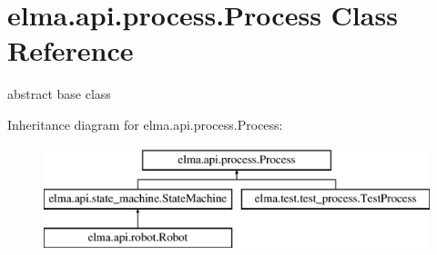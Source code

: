 \hypertarget{classelma_1_1api_1_1process_1_1Process}{}\section{elma.\+api.\+process.\+Process Class Reference}
\label{classelma_1_1api_1_1process_1_1Process}


abstract base class  


Inheritance diagram for elma.\+api.\+process.\+Process\+:\begin{figure}[H]
\begin{center}
\leavevmode
\includegraphics[height=3.000000cm]{classelma_1_1api_1_1process_1_1Process}
\end{center}
\end{figure}
